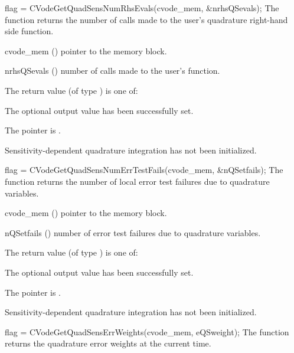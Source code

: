 {
  flag = CVodeGetQuadSensNumRhsEvals(cvode\_mem, \&nrhsQSevals);
}
{
  The function  returns the 
  number of calls made to the user's quadrature right-hand side function.
}
{
  \begin{args}[nrhsQSevals]
  \item[cvode\_mem] ()
    pointer to the {\cvodes} memory block.
  \item[nrhsQSevals] ()
    number of calls made to the user's  function.
  \end{args}
}
{
  The return value  (of type ) is one of:
  \begin{args}[CV\_NO\_QUADSENS]
  \item[\Id{CV\_SUCCESS}] 
    The optional output value has been successfully set.
  \item[\Id{CVODE\_MEM\_NULL}]
    The  pointer is .
  \item[\Id{CV\_NO\_QUADSENS}]
    Sensitivity-dependent quadrature integration has not been initialized.
  \end{args}
}
{}
{
  flag = CVodeGetQuadSensNumErrTestFails(cvode\_mem, \&nQSetfails);
}
{
  The function  returns the
  number of local error test failures due to quadrature variables.
}
{
  \begin{args}[nQSetfails]
  \item[cvode\_mem] ()
    pointer to the {\cvodes} memory block.
  \item[nQSetfails] ()
    number of error test failures due to quadrature variables.
  \end{args}
}
{
  The return value  (of type ) is one of:
  \begin{args}[CV\_NO\_QUADSENS]
  \item[\Id{CV\_SUCCESS}] 
    The optional output value has been successfully set.
  \item[\Id{CVODE\_MEM\_NULL}]
    The  pointer is .
  \item[\Id{CV\_NO\_QUADSENS}]
    Sensitivity-dependent quadrature integration has not been initialized.
  \end{args}
}
{}
{
  flag = CVodeGetQuadSensErrWeights(cvode\_mem, eQSweight);
}
{
  The function  returns the quadrature error weights 
  at the current time.
}
